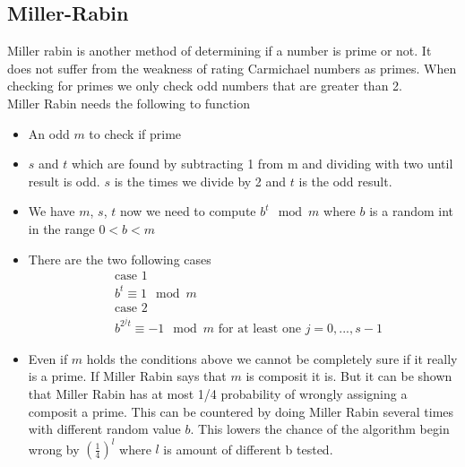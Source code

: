 \subsection{Miller-Rabin}
Miller rabin is another method of determining if a number is prime or not. It does not suffer from the weakness of rating Carmichael numbers as primes. When checking for primes we only check odd numbers that are greater than 2.\\
Miller Rabin needs the following to function
\begin{itemize}
\item An odd $m$ to check if prime
\item $s$ and $t$ which are found by subtracting 1 from m and dividing with two until result is odd. $s$ is the times we divide by 2 and $t$ is the odd result.
\item We have $m$, $s$, $t$ now we need to compute $b^t\mod m$ where $b$ is a random int in the range $0<b<m$
\item There are the two following cases
\begin{align*}
&\mbox{case 1}\\
&b^t \equiv 1 \mod m\\
&\mbox{case 2}\\
&b^{2^{j}t} \equiv -1 \mod m \mbox{ for at least one $j=0,...,s-1$}
\end{align*}
\item Even if $m$ holds the conditions above we cannot be completely sure if it really is a prime. If Miller Rabin says that $m$ is composit it is. But it can be shown that Miller Rabin has at most 1/4 probability of wrongly assigning a composit a prime. This can be countered by doing Miller Rabin several times with different random value $b$. This lowers the chance of the algorithm begin wrong by $(\frac{1}{4})^l$ where $l$ is amount of different b tested.
\end{itemize}
